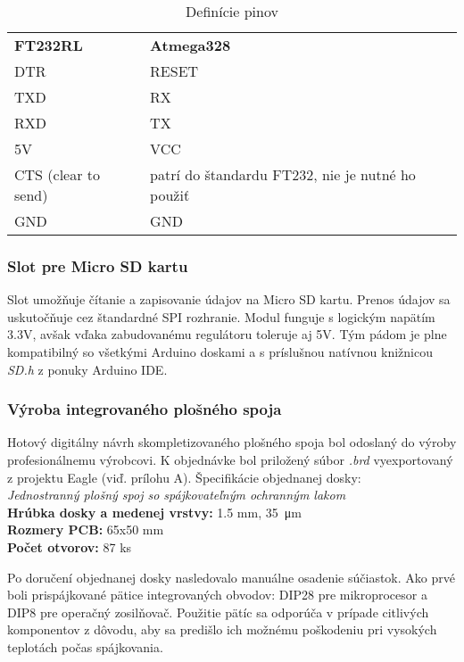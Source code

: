 \documentclass[titlepage,12pt]{article}
\begin{document}
\begin{table}[htb]
\caption{Definície pinov}
\begin{tabular}{ll}
\\
\textbf{FT232RL}  	& \textbf{Atmega328}   \\
DTR          		& RESET                \\
TXD			 		& RX                   \\
RXD					& TX				   \\
5V					& VCC				   \\
CTS (clear to send) & patrí do štandardu FT232, nie je nutné ho použiť \\
GND					& GND
\end{tabular}
\end{table}

\subsubsection*{Slot pre Micro SD kartu}
Slot umožňuje čítanie a zapisovanie údajov na Micro SD kartu. Prenos údajov sa uskutočňuje cez štandardné SPI rozhranie. Modul funguje s logickým napätím 3.3V, avšak vďaka zabudovanému regulátoru toleruje aj 5V. Tým pádom je plne kompatibilný so všetkými Arduino doskami a s príslušnou natívnou knižnicou \emph{SD.h} z ponuky Arduino IDE.

\subsubsection*{Výroba integrovaného plošného spoja}
Hotový digitálny návrh skompletizovaného plošného spoja bol odoslaný do výroby profesionálnemu výrobcovi. K objednávke bol priložený súbor \textit{.brd} vyexportovaný z projektu Eagle (viď. prílohu A). Špecifikácie objednanej dosky: \\
\emph{Jednostranný plošný spoj so spájkovateľným ochranným lakom} \\
\textbf{Hrúbka dosky a medenej vrstvy:} 1.5 mm, \SI{35}{\micro\m} \\
\textbf{Rozmery PCB:} 65x50 mm \\
\textbf{Počet otvorov:} 87 ks

Po doručení objednanej dosky nasledovalo manuálne osadenie súčiastok. Ako prvé boli prispájkované pätice integrovaných obvodov: DIP28 pre mikroprocesor a DIP8 pre operačný zosilňovač. Použitie pätíc sa odporúča v prípade citlivých komponentov z dôvodu, aby sa predišlo ich možnému poškodeniu pri vysokých teplotách počas spájkovania.
\end{document}

